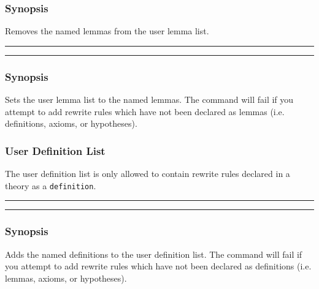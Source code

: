 
\subsubsection*{Synopsis}
Removes the named lemmas from the user lemma list.

\vspace{2mm}
\hrule
\vspace{2mm}
\begin{Large}
\end{Large}
\vspace{2mm}
\hrule
\vspace{2mm}


\subsubsection*{Synopsis}
Sets the user lemma list to the named lemmas. The command will fail
if you attempt to add rewrite rules which have not been declared as
lemmas (i.e. definitions, axioms, or hypotheses).



\subsubsection{User Definition List}
The user definition list is only allowed to contain rewrite rules declared
in a theory as a \texttt{definition}.

\vspace{2mm}
\hrule
\vspace{2mm}
\begin{Large}
\end{Large}
\vspace{2mm}
\hrule
\vspace{2mm}


\subsubsection*{Synopsis}
Adds the named definitions to the user definition list.  The command will fail
if you attempt to add rewrite rules which have not been declared as
definitions (i.e. lemmas, axioms, or hypotheses).

